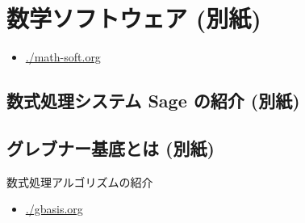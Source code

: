 \documentclass[dvipdfmx,11pt]{jarticle}
\begin{document}
\section{数学ソフトウェア (別紙)}
\label{sec:orgc60b269}

\begin{itemize}
\item \url{./math-soft.org}
\end{itemize}

\subsection{数式処理システム Sage の紹介 (別紙)}
\label{sec:org79cfd0a}

\subsection{グレブナー基底とは (別紙)}
\label{sec:org5682027}

数式処理アルゴリズムの紹介


\begin{itemize}
\item \url{./gbasis.org}
\end{itemize}
\end{document}
